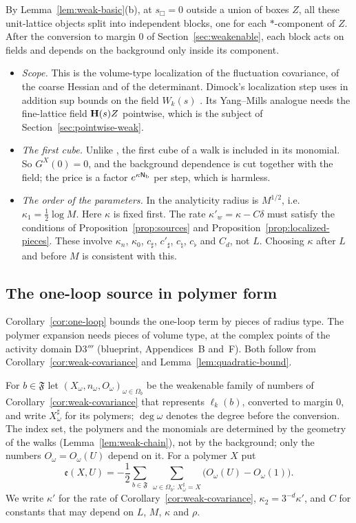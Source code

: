 By Lemma~\ref{lem:weak-basic}(b), at $s_\Box=0$ outside a union of boxes $Z$, all these unit-lattice objects split into independent blocks, one for each $*$-component of $Z$. After the conversion to margin $0$ of Section~\ref{sec:weakenable}, each block acts on fields and depends on the background only inside its component.
\begin{itemize}
\item \emph{Scope.} This is the volume-type localization of the fluctuation covariance, of the coarse Hessian and of the determinant. Dimock's localization step \cite[(225)--(233)]{DimockI} uses in addition sup bounds on the field $W_k(s)$ \cite[Lemma~16, (100)]{DimockI}. Its Yang--Mills analogue needs the fine-lattice field $\mathbf H(s)Z$ pointwise, which is the subject of Section~\ref{sec:pointwise-weak}.
\item \emph{The first cube.} Unlike \cite[(102)]{DimockI}, the first cube of a walk is included in its monomial. So $G^X(0)=0$, and the background dependence is cut together with the field; the price is a factor $e^{\kappa\mathsf N_{\rm b}}$ per step, which is harmless.
\item \emph{The order of the parameters.} In \cite{DimockI} the analyticity radius is $M^{1/2}$, i.e.\ $\kappa_1=\frac12\log M$. Here $\kappa$ is fixed first. The rate $\kappa'_w=\kappa-C\delta$ must satisfy the conditions of Proposition~\ref{prop:sources} and Proposition~\ref{prop:localized-pieces}. These involve $\kappa_n$, $\kappa_0$, $c_\sharp$, $c'_\sharp$, $c_\natural$, $c_\flat$ and $C_d$, not $L$. Choosing $\kappa$ after $L$ and before $M$ is consistent with this.
\end{itemize}

\subsection{The one-loop source in polymer form}\label{sec:one-loop-polymer}

Corollary~\ref{cor:one-loop} bounds the one-loop term by pieces of radius type. The polymer expansion needs pieces of volume type, at the complex points of the activity domain D3$'''$ (blueprint, Appendices~B and~F). Both follow from Corollary~\ref{cor:weak-covariance} and Lemma~\ref{lem:quadratic-bound}.

For $b\in\mathfrak F$ let $(X_\omega,n_\omega,O_\omega)_{\omega\in\Omega_b}$ be the weakenable family of numbers of Corollary~\ref{cor:weak-covariance} that represents $\ell_k(b)$, converted to margin $0$, and write $X^\sharp_\omega$ for its polymers; $\deg\omega$ denotes the degree before the conversion. The index set, the polymers and the monomials are determined by the geometry of the walks (Lemma~\ref{lem:weak-chain}), not by the background; only the numbers $O_\omega=O_\omega(U)$ depend on it. For a polymer $X$ put
\[
\mathfrak e(X,U)=-\frac12\sum_{b\in\mathfrak F}\ \sum_{\omega\in\Omega_b:\,X^\sharp_\omega=X}\big(O_\omega(U)-O_\omega(1)\big).
\]
We write $\kappa'$ for the rate of Corollary~\ref{cor:weak-covariance}, $\kappa_2=3^{-d}\kappa'$, and $C$ for constants that may depend on $L$, $M$, $\kappa$ and $\rho$.

